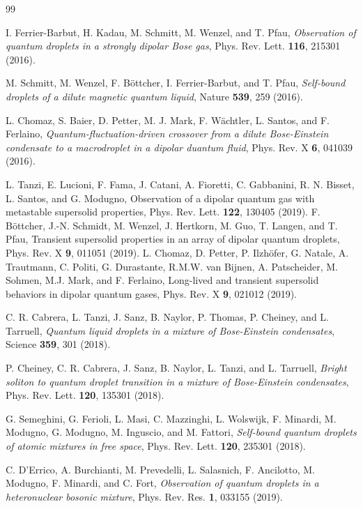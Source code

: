 \documentclass[reprint,aps,pra,twocolumn,superscriptaddress]{revtex4-1}
\begin{document}
\begin{thebibliography}{99}

 I. Ferrier-Barbut, H. Kadau, M. Schmitt, M. Wenzel, and T. Pfau, \textit{Observation of quantum droplets in a strongly dipolar Bose gas}, Phys. Rev. Lett. {\bf 116}, 215301 (2016).

 M. Schmitt, M. Wenzel, F. B{\"o}ttcher, I. Ferrier-Barbut, and T. Pfau, \textit{Self-bound droplets of a dilute magnetic quantum liquid}, Nature {\bf 539}, 259 (2016).

 L. Chomaz, S. Baier, D. Petter, M. J. Mark, F. W{\"a}chtler, L. Santos, and F. Ferlaino, \textit{Quantum-fluctuation-driven crossover from a dilute Bose-Einstein condensate to a macrodroplet in a dipolar duantum fluid}, Phys. Rev. X {\bf 6}, 041039 (2016).

L. Tanzi, E. Lucioni, F. Fama, J. Catani, A. Fioretti, C. Gabbanini, R. N. Bisset, L. Santos, and G. Modugno, Observation of a dipolar quantum gas with metastable supersolid properties, Phys. Rev. Lett. {\bf 122}, 130405 (2019).
F. B{\" o}ttcher, J.-N. Schmidt, M. Wenzel, J. Hertkorn, M. Guo, T. Langen, and T. Pfau, Transient supersolid properties in an array of dipolar quantum droplets, Phys. Rev. X {\bf 9}, 011051 (2019).
L. Chomaz, D. Petter, P. Ilzh{\"{o}}fer, G. Natale, A. Trautmann, C. Politi, G. Durastante, R.M.W. van Bijnen, A. Patscheider, M. Sohmen, M.J. Mark, and F. Ferlaino, Long-lived and transient supersolid behaviors in dipolar quantum gases, Phys. Rev. X {\bf 9}, 021012 (2019).


 C. R. Cabrera, L. Tanzi, J. Sanz, B. Naylor, P. Thomas, P. Cheiney, and L. Tarruell, \textit{Quantum liquid droplets in a mixture of Bose-Einstein condensates}, Science {\bf 359}, 301 (2018).


 P. Cheiney, C. R. Cabrera, J. Sanz, B. Naylor, L. Tanzi, and L. Tarruell, \textit{Bright soliton to quantum droplet transition in a mixture of Bose-Einstein condensates}, Phys. Rev. Lett. {\bf 120}, 135301 (2018).

 G. Semeghini, G. Ferioli, L. Masi, C. Mazzinghi, L. Wolswijk, F. Minardi, M. Modugno, G. Modugno, M. Inguscio, and M. Fattori, \textit{Self-bound quantum droplets of atomic mixtures in free space}, Phys. Rev. Lett. {\bf 120}, 235301 (2018).


 C. D'Errico, A. Burchianti, M. Prevedelli, L. Salasnich, F. Ancilotto, M. Modugno, F. Minardi, and C. Fort, \textit{Observation of quantum droplets in a heteronuclear bosonic mixture}, Phys. Rev. Res. {\bf 1}, 033155 (2019).


\end{thebibliography}
\end{document}
